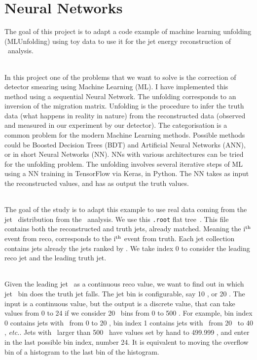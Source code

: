\section{Neural Networks}
\label{sec:NeuralNetworks}

The goal of this project is to adapt a code example of machine learning unfolding (MLUnfolding) using toy data to use it for the jet energy reconstruction of \ttbaremu~analysis.

\ \\In this project one of the problems that we want to solve is the correction of detector smearing using Machine Learning (ML). I have implemented this method using a sequential Neural Network. The unfolding corresponds to an inversion of the migration matrix. Unfolding is the procedure to infer the truth data (what happens in reality in nature) from the reconstructed data (observed and measured in our experiment by our detector). The categorisation is a common problem for the modern Machine Learning methods. Possible methods could be Boosted Decision Trees (BDT) and Artificial Neural Networks (ANN), or in short Neural Networks (NN). NNs with various architectures can be tried for the unfolding problem. The unfolding involves several iterative steps of ML using a NN training in TensorFlow via Keras, in Python. The NN takes as input the reconstructed values, and has as output the truth values.

\ \\The goal of the study is to adapt this example to use real data coming from the jet \pt~distribution from the \ttbaremu~analysis. We use this \texttt{.root} flat tree~\cite{RootFile}. This file contains both the reconstructed and truth jets, already matched. Meaning the i$^{\rm th}$ event from reco, corresponds to the i$^{\rm th}$ event from truth. Each jet collection contains jets already the jets ranked by \pt. We take index 0 to consider the leading reco jet and the leading truth jet.

\ \\Given the leading jet \pt~as a continuous reco value, we want to find out in which jet \pt~bin does the truth jet falls. The jet bin is configurable, say 10 \GeV, or 20 \GeV. The input is a continuous value, but the output is a discrete value, that can take values from 0 to 24 if we consider 20 \GeV~bins from 0 to 500 \GeV. For example, bin index 0 contains jets with \pt~from 0 to 20 \GeV, bin index 1 contains jets with \pt~from 20 \GeV~to 40 \GeV, \emph{etc.}. Jets with \pt~larger than 500 \GeV~have values set by hand to 499.999 \GeV, and enter in the last possible bin index, number 24. It is equivalent to moving the overflow bin of a histogram to the last bin of the histogram. 

